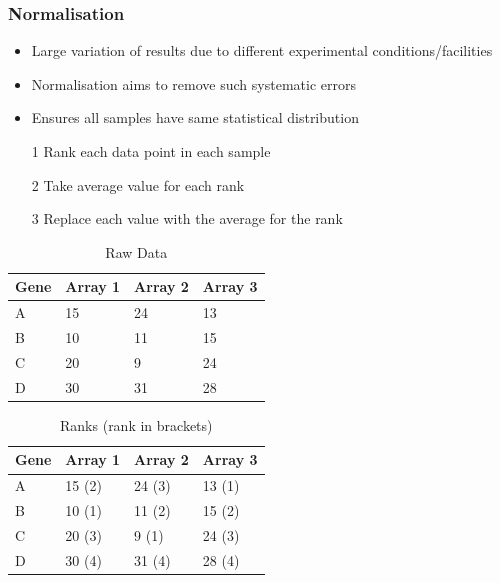 \documentclass[a4paper]{article}
\begin{document}
\subsubsection{Normalisation}

\begin{itemize}
  \item
    Large variation of results due to different experimental
    conditions/facilities

  \item
    Normalisation aims to remove such systematic errors

  \item
    Ensures all samples have same statistical distribution
\end{itemize}


\begin{enumerate}
  \item[1]
    Rank each data point in each sample

  \item[2]
    Take average value for each rank

  \item[3]
    Replace each value with the average for the rank
\end{enumerate}

\begin{table}[h!]
  \centering
  \begin{tabular}{@{}llll@{}}
    \toprule
    Gene & Array 1 & Array 2 & Array 3 \\
    \midrule
    A    & 15      & 24      & 13      \\
    B    & 10      & 11      & 15      \\
    C    & 20      & 9       & 24      \\
    D    & 30      & 31      & 28      \\
    \bottomrule
  \end{tabular}
  \caption{Raw Data}
  \label{tab:qn_raw}
\end{table}

\begin{table}[h!]
  \centering
  \begin{tabular}{@{}llll@{}}
    \toprule
    Gene & Array 1 & Array 2 & Array 3 \\
    \midrule
    A    & 15 (2)  & 24 (3)  & 13 (1)  \\
    B    & 10 (1)  & 11 (2)  & 15 (2)  \\
    C    & 20 (3)  & 9 (1)   & 24 (3)  \\
    D    & 30 (4)  & 31 (4)  & 28 (4)  \\
    \bottomrule
  \end{tabular}
  \caption{Ranks (rank in brackets)}
  \label{tab:qn_raw}
\end{table}
\end{document}
